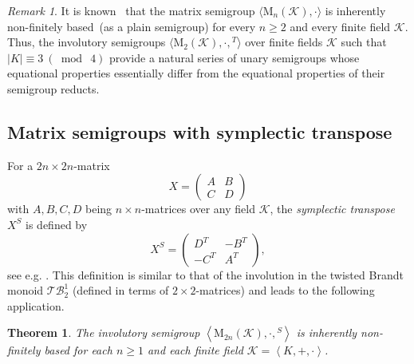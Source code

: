 \documentclass[11pt,reqno]{amsart}
\numberwithin{equation}{section}
\newtheorem{Thm}{Theorem}[section]
\theoremstyle{remark}
\newtheorem{Rmk}{Remark}[section]
\def\sm{semi\-group}
\def\fb{finitely based}
\begin{document}
\begin{Rmk}
It is known~\cite[Corollary~6.2]{sapirburnside} that the matrix
semigroup $\langle\mathrm{M}_n(\mathcal{K}),\cdot\rangle$ is
inherently non-\fb\ (as a plain \sm) for every $n\ge 2$ and every
finite field $\mathcal{K}$. Thus, the involutory semigroups
$\langle\mathrm{M}_2(\mathcal{K}),\cdot,{}^T\rangle$ over finite
fields $\mathcal{K}$ such that $\vert K\vert\equiv 3\ (\bmod\ 4)$
provide a natural series of unary semigroups whose equational
properties essentially differ from the equational properties of
their semigroup reducts.
\end{Rmk}

\subsection{Matrix semigroups with symplectic transpose}
For a $2n\times 2n$-matrix
$$X=\begin{pmatrix} A & B\\ C & D\end{pmatrix}$$ with $A,B,C, D$ being
$n\times n$-matrices over any field $\mathcal{K}$, the
\emph{symplectic transpose} $X^S$ is defined by
$$X^S=\begin{pmatrix} D^T & -B^T\\ -C^T & A^T\end{pmatrix},$$
see e.g. \cite[(5.1.1)]{Procesi}. This definition is similar to
that of the involution in the twisted Brandt monoid
$\mathcal{TB}^1_2$ (defined in terms of $2\times 2$-matrices) and
leads to the following application.
\begin{Thm}\label{symplecticinvolution}
The involutory semigroup
$\left<\mathrm{M}_{2n}(\mathcal{K}),\cdot,{}^S\right>$ is
inherently non-finitely based for each $n\ge 1$ and each finite
field $\mathcal{K}=\left<K,+,\cdot\right>$.
\end{Thm}
\end{document}
